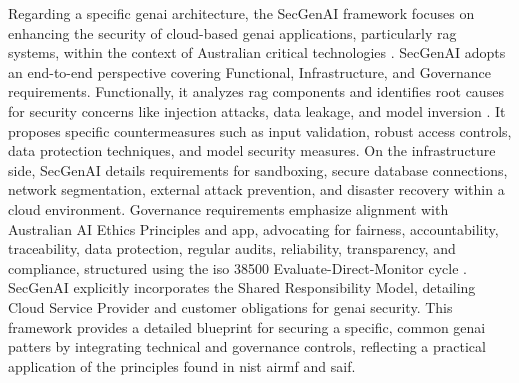 Regarding a specific \gls{genai} architecture, the SecGenAI framework focuses on enhancing the security of cloud-based \gls{genai} applications, particularly \gls{rag} systems, within the context of Australian critical technologies \cite{haryanto_secgenai_2024}. SecGenAI adopts an end-to-end perspective covering Functional, Infrastructure, and Governance requirements. Functionally, it analyzes \gls{rag} components and identifies root causes for security concerns like injection attacks, data leakage, and model inversion \cite{haryanto_secgenai_2024}. It proposes specific countermeasures such as input validation, robust access controls, data protection techniques, and model security measures\cite{haryanto_secgenai_2024}. On the infrastructure side, SecGenAI details requirements for sandboxing, secure database connections, network segmentation, external attack prevention, and disaster recovery within a cloud environment\cite{haryanto_secgenai_2024}. Governance requirements emphasize alignment with Australian AI Ethics Principles and \gls{app}, advocating for fairness, accountability, traceability, data protection, regular audits, reliability, transparency, and compliance, structured using the \gls{iso} 38500 Evaluate-Direct-Monitor cycle \cite{noauthor_isoiec_nodate}. SecGenAI explicitly incorporates the Shared Responsibility Model, detailing Cloud Service Provider and customer obligations for \gls{genai} security\cite{haryanto_secgenai_2024}. This framework provides a detailed blueprint for securing a specific, common \gls{genai} patters by integrating technical and governance controls, reflecting a practical application of the principles found in \gls{nist} \gls{airmf} and \gls{saif}.

